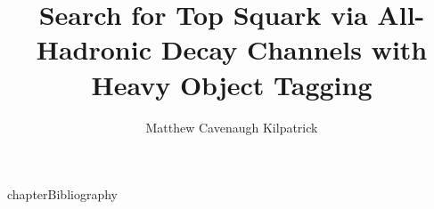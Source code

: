 \documentclass[12pt]{ruthesis}
\title{Search for Top Squark via All-Hadronic Decay Channels with Heavy Object Tagging}
\author{Matthew Cavenaugh Kilpatrick}
\begin{document}
  \begin{frontmatter}
   \maketitle
   
   \tableofcontents
   \listoffigures
   \listoftables
%   
  \end{frontmatter}










\appendix

%
%
%
 {chapter}{\numberline {}Bibliography}{}





\end{document}
